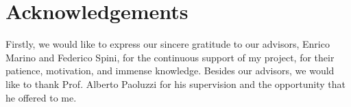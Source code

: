 \chapter{Acknowledgements}
\label{cha:acknowledgements}

Firstly, we would like to express our sincere gratitude to our advisors, Enrico Marino and Federico Spini, for the continuous support of my project, for their patience, motivation, and immense knowledge. Besides our advisors, we would like to thank Prof. Alberto Paoluzzi for his supervision and the opportunity that he offered to me.